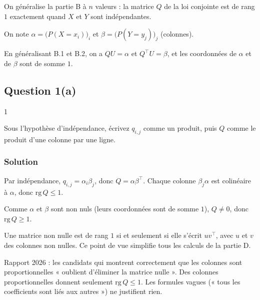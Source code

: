 \documentclass[11pt,a4paper]{article}
\newcommand{\equationajustee}[1]{%
  \sbox{\boiteequation}{$\displaystyle #1$}%
  \ifdim\wd\boiteequation>\linewidth
    \[\resizebox{\linewidth}{!}{\usebox{\boiteequation}}\]%
  \else
    \[#1\]%
  \fi}
\begin{document}
On généralise la partie B à \(n\) valeurs : la matrice \(Q\) de la loi conjointe est de rang \(1\) exactement quand \(X\) et \(Y\) sont indépendantes.

On note \(\alpha=\big(P(X=x_i)\big)_i\) et \(\beta=\big(P(Y=y_j)\big)_j\) (colonnes).

En généralisant B.1 et B.2, on a \(QU=\alpha\) et \(Q^\top U=\beta\), et les coordonnées de \(\alpha\) et de \(\beta\) sont de somme \(1\).

\hypertarget{question-1a-2}{%
\subsection{Question 1(a)}\label{question-1a-2}}

\begin{indication}{1}

Sous l'hypothèse d'indépendance, écrivez \(q_{i,j}\) comme un produit, puis \(Q\) comme le produit d'une colonne par une ligne.

\end{indication}

\hypertarget{solution-36}{%
\subsubsection{Solution}\label{solution-36}}

Par indépendance, \(q_{i,j}=\alpha_i\beta_j\), donc \(Q=\alpha\beta^\top\). Chaque colonne \(\beta_j\alpha\) est colinéaire à \(\alpha\), donc \(\mathrm{rg}\,Q\le1\).

Comme \(\alpha\) et \(\beta\) sont non nuls (leurs coordonnées sont de somme \(1\)), \(Q\neq0\), donc \(\mathrm{rg}\,Q\geqslant1\).

\equationajustee{\boxed{\mathrm{rg}\,Q=1}}

\begin{methode}

Une matrice non nulle est de rang \(1\) si et seulement si elle s'écrit \(uv^\top\), avec \(u\) et \(v\) des colonnes non nulles. Ce point de vue simplifie tous les calculs de la partie D.

\end{methode}

\begin{piege}

Rapport 2026 : les candidats qui montrent correctement que les colonnes sont proportionnelles « oublient d'éliminer la matrice nulle ». Des colonnes proportionnelles donnent seulement \(\mathrm{rg}\,Q\le1\). Les formules vagues (« tous les coefficients sont liés aux autres ») ne justifient rien.

\end{piege}
\end{document}

